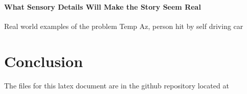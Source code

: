 \documentclass[conference]{IEEEtran}
\begin{document}
\paragraph{What Sensory Details Will Make the Story Seem Real}
Real world examples of the problem
Temp Az, person hit by self driving car\cite{noauthor_how_nodate}

\section{Conclusion}

The files for this latex document are in the github repository located at 

\nocite{*}



\end{document}
